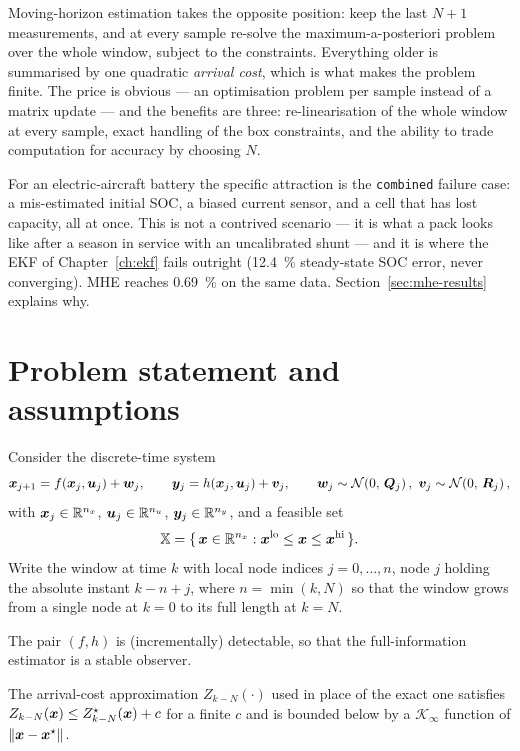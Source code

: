 Moving-horizon estimation \citep{robertson1996mhe,rao2003mhe} takes the opposite position: keep the
last $N{+}1$ measurements, and at every sample re-solve the maximum-a-posteriori problem over the
whole window, subject to the constraints.  Everything older is summarised by one quadratic
\emph{arrival cost}, which is what makes the problem finite.  The price is obvious --- an
optimisation problem per sample instead of a matrix update --- and the benefits are three:
re-linearisation of the whole window at every sample, exact handling of the box constraints, and
the ability to trade computation for accuracy by choosing $N$.

For an electric-aircraft battery the specific attraction is the \texttt{combined} failure case:
a mis-estimated initial SOC, a biased current sensor, and a cell that has lost capacity, all at
once.  This is not a contrived scenario --- it is what a pack looks like after a season in service
with an uncalibrated shunt --- and it is where the EKF of Chapter~\ref{ch:ekf} fails outright
(\SI{12.4}{\percent} steady-state SOC error, never converging).  MHE reaches \SI{0.69}{\percent} on
the same data.  Section~\ref{sec:mhe-results} explains why.

\section{Problem statement and assumptions}
Consider the discrete-time system
\begin{equation}\label{eq:mhe-sys}
\bm{x}_{j+1} = f(\bm{x}_j,\bm{u}_j) + \bm{w}_j,\qquad
\bm{y}_j = h(\bm{x}_j,\bm{u}_j) + \bm{v}_j,\qquad
\bm{w}_j\sim\mathcal{N}\!\left(0,\,\bm{Q}_j\right),\ \bm{v}_j\sim\mathcal{N}\!\left(0,\,\bm{R}_j\right),
\end{equation}
with $\bm{x}_j\in\mathbb{R}^{n_x}$, $\bm{u}_j\in\mathbb{R}^{n_u}$, $\bm{y}_j\in\mathbb{R}^{n_y}$, and a feasible set
\begin{equation}\label{eq:mhe-box}
\mathbb{X} = \{\,\bm{x}\in\mathbb{R}^{n_x} : \bm{x}^{\mathrm{lo}}\le \bm{x}\le \bm{x}^{\mathrm{hi}}\,\}.
\end{equation}
Write the window at time $k$ with local node indices $j = 0,\dots,n$, node $j$ holding the absolute
instant $k-n+j$, where $n = \min(k,N)$ so that the window grows from a single node at $k=0$ to its
full length at $k=N$.

\begin{assumption}[Detectability]\label{as:mhe-det}
The pair $(f,h)$ is (incrementally) detectable, so that the full-information estimator is a stable
observer.
\end{assumption}
\begin{assumption}\label{as:mhe-arr}
The arrival-cost approximation $Z_{k-N}(\cdot)$ used in place of the exact one satisfies
$Z_{k-N}(\bm{x})\le Z^\star_{k-N}(\bm{x}) + c$ for a finite $c$ and is bounded below by a
$\mathcal{K}_\infty$ function of $\left\lVert \bm{x}-\bm{x}^\star \right\rVert$.
\end{assumption}

